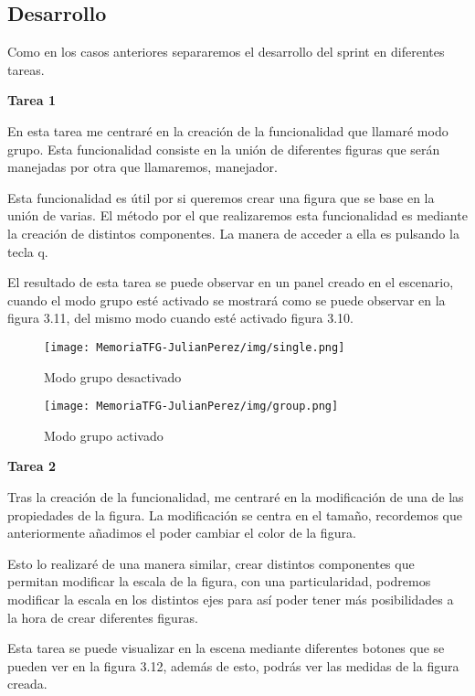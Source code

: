 \documentclass[a4paper, 12pt]{book}
\begin{document}
\subsection{Desarrollo}
Como en los casos anteriores separaremos el desarrollo del sprint en diferentes tareas.

\textbf{Tarea 1}

En esta tarea me centraré en la creación de la funcionalidad que llamaré modo grupo. Esta funcionalidad consiste en la unión de diferentes figuras que serán manejadas por otra que llamaremos, manejador. 

Esta funcionalidad es útil por si queremos crear una figura que se base en la unión de varias. El método por el que realizaremos esta funcionalidad es mediante la creación de distintos componentes. La manera de acceder a ella es pulsando la tecla q. 

El resultado de esta tarea se puede observar en un panel creado en el escenario, cuando el modo grupo esté activado se mostrará como se puede observar en la figura 3.11, del mismo modo cuando esté activado figura 3.10.

\begin{figure}[H]
  \centering
  \begin{minipage}[b]{0.4\textwidth}
 \texttt{[image: MemoriaTFG-JulianPerez/img/single.png]}
  \caption{Modo grupo desactivado}\label{single}
  \end{minipage}
  \hfill
  \begin{minipage}[b]{0.4\textwidth}
  \texttt{[image: MemoriaTFG-JulianPerez/img/group.png]}
  \caption{Modo grupo activado}\label{scrum}
  \end{minipage}
\end{figure}

\textbf{Tarea 2}

Tras la creación de la funcionalidad, me centraré en la modificación de una de las propiedades de la figura. La modificación se centra en el tamaño, recordemos que anteriormente añadimos el poder cambiar el color de la figura.

Esto lo realizaré de una manera similar, crear distintos componentes que permitan modificar la escala de la figura, con una particularidad, podremos modificar la escala en los distintos ejes para así poder tener más posibilidades a la hora de crear diferentes figuras. 

Esta tarea se puede visualizar en la escena mediante diferentes botones que se pueden ver en la figura 3.12, además de esto, podrás ver las medidas de la figura creada.
\end{document}
